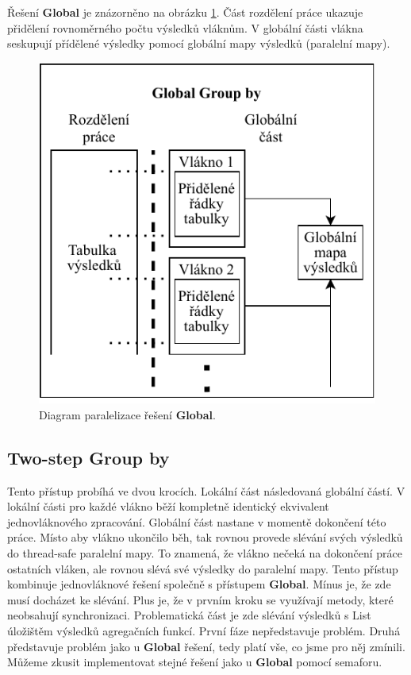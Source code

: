 Řešení \textbf{Global} je znázorněno na obrázku \ref{figure.diaGlobalGr}.
Část rozdělení práce ukazuje přidělení rovnoměrného počtu výsledků vláknům.
V globální části vlákna seskupují přídělené výsledky pomocí globální mapy výsledků (paralelní mapy).

\begin{figure}[!htp]
\includegraphics{../img/diaGlobalGr.pdf}\centering
\caption{Diagram paralelizace řešení \textbf{Global}.}
\label{figure.diaGlobalGr}
\end{figure}

\subsection{Two-step Group by} \label{anal.groupby.twostep}

Tento přístup probíhá ve dvou krocích.
Lokální část následovaná globální částí. 
V lokální části pro každé vlákno běží kompletně identický ekvivalent jednovláknového zpracování.
Globální část nastane v momentě dokončení této práce.
Místo aby vlákno ukončilo běh, tak rovnou provede slévání svých výsledků do thread-safe paralelní mapy.
To znamená, že vlákno nečeká na dokončení práce ostatních vláken, ale rovnou slévá své výsledky do paralelní mapy.
Tento přístup kombinuje jednovláknové řešení společně s přístupem \textbf{Global}.
Mínus je, že zde musí docházet ke slévání.
Plus je, že v prvním kroku se využívají metody, které neobsahují synchronizaci. 
Problematická část je zde slévání výsledků s List úložištěm výsledků agregačních funkcí.
První fáze nepředstavuje problém. 
Druhá představuje problém jako u \textbf{Global} řešení, tedy platí vše, co jsme pro něj zmínili.
Můžeme zkusit implementovat stejné řešení jako u \textbf{Global} pomocí semaforu.

